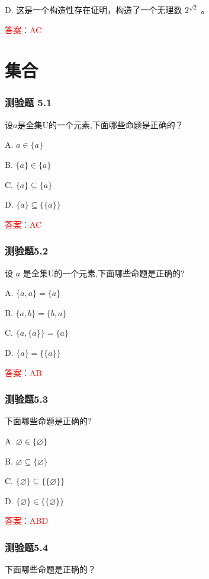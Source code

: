\documentclass[UTF8, heading=true]{ctexart}
\begin{document}
D. 这是一个构造性存在证明，构造了一个无理数 $2^{\sqrt{2}}$ 。

\textcolor{red}{答案：AC}




\clearpage

\section{集合}

\subsubsection{测验题 5.1}
设$a$是全集U的一个元素,下面哪些命题是正确的？

A. $ a \in\{a\}$

B. $\{a\} \in\{a\}$

C. $\{a\} \subseteq\{a\}$

D. $\{a\} \subseteq\{\{a\}\}$

\textcolor{red}{答案：AC}

\subsubsection{测验题5.2}

设 $a$ 是全集U的一个元素,下面哪些命题是正确的?

A. $\{a, a\}=\{a\}$

B. $\{a, b\}=\{b, a\}$

C. $\{a,\{a\}\}=\{a\}$

D. $\{a\}=\{\{a\}\}$

\textcolor{red}{答案：AB}

\subsubsection{测验题5.3}
下面哪些命题是正确的?

A. 
$
\varnothing \in\{\varnothing\}
$

B. 
$
\varnothing \subseteq\{\varnothing\}
$

C. 
$
\{\varnothing\} \subseteq\{\{\varnothing\}\}
$

D. 
$
\{\varnothing\} \in\{\{\varnothing\}\}
$

\textcolor{red}{答案：ABD}


\subsubsection{测验题5.4}
下面哪些命题是正确的？
\end{document}
